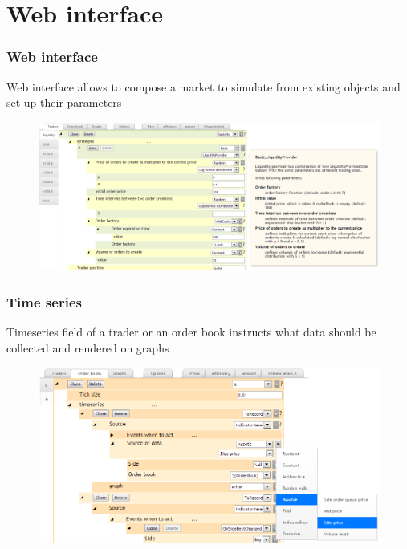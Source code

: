 \documentclass{beamer}
\begin{document}
\section{Web interface}
\begin{frame}
\frametitle{Web interface}
Web interface allows to compose a market to simulate from existing objects and set up their parameters
\begin{figure}[htbp]
\centering
\includegraphics[width=1\linewidth]{js-help.png}
\end{figure}
\end{frame}

\begin{frame}
\frametitle{Time series}
Timeseries field of a trader or an order book instructs what data should be collected and rendered on graphs
\begin{figure}[htbp]
\centering
\includegraphics[width=1\linewidth]{js-timeserie.png}
\end{figure}
\end{frame}
\end{document}
